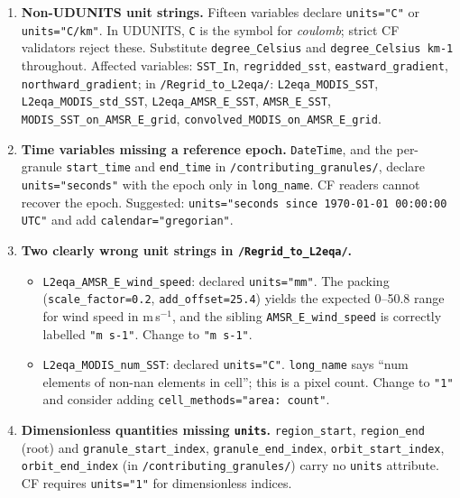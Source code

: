 \documentclass[11pt]{article}
\begin{document}
\begin{enumerate}[leftmargin=*,topsep=2pt]
  \item \textbf{Non-UDUNITS unit strings.} Fifteen variables declare
    \texttt{units="C"} or \texttt{units="C/km"}. In UDUNITS,
    \texttt{C} is the symbol for \emph{coulomb}; strict CF
    validators reject these. Substitute
    \texttt{degree\_Celsius} and \texttt{degree\_Celsius km-1}
    throughout. Affected variables: \texttt{SST\_In},
    \texttt{regridded\_sst}, \texttt{eastward\_gradient},
    \texttt{northward\_gradient}; in
    \texttt{/Regrid\_to\_L2eqa/}: \texttt{L2eqa\_MODIS\_SST},
    \texttt{L2eqa\_MODIS\_std\_SST},
    \texttt{L2eqa\_AMSR\_E\_SST}, \texttt{AMSR\_E\_SST},
    \texttt{MODIS\_SST\_on\_AMSR\_E\_grid},
    \texttt{convolved\_MODIS\_on\_AMSR\_E\_grid}.

  \item \textbf{Time variables missing a reference epoch.}
    \texttt{DateTime}, and the per-granule \texttt{start\_time} and
    \texttt{end\_time} in \texttt{/contributing\_granules/}, declare
    \texttt{units="seconds"} with the epoch only in
    \texttt{long\_name}. CF readers cannot recover the epoch.
    Suggested: \texttt{units="seconds since 1970-01-01 00:00:00
    UTC"} and add \texttt{calendar="gregorian"}.

  \item \textbf{Two clearly wrong unit strings in
    \texttt{/Regrid\_to\_L2eqa/}.}
    \begin{itemize}[topsep=0pt]
      \item \texttt{L2eqa\_AMSR\_E\_wind\_speed}: declared
        \texttt{units="mm"}. The packing
        (\texttt{scale\_factor=0.2}, \texttt{add\_offset=25.4})
        yields the expected 0--50.8 range for wind speed in
        m\,s$^{-1}$, and the sibling \texttt{AMSR\_E\_wind\_speed}
        is correctly labelled \texttt{"m s-1"}. Change to
        \texttt{"m s-1"}.
      \item \texttt{L2eqa\_MODIS\_num\_SST}: declared
        \texttt{units="C"}. \texttt{long\_name} says
        ``num elements of non-nan elements in cell''; this is a
        pixel count. Change to \texttt{"1"} and consider adding
        \texttt{cell\_methods="area: count"}.
    \end{itemize}

  \item \textbf{Dimensionless quantities missing \texttt{units}.}
    \texttt{region\_start}, \texttt{region\_end} (root) and
    \texttt{granule\_start\_index}, \texttt{granule\_end\_index},
    \texttt{orbit\_start\_index}, \texttt{orbit\_end\_index} (in
    \texttt{/contributing\_granules/}) carry no \texttt{units}
    attribute. CF requires \texttt{units="1"} for dimensionless
    indices.


\end{enumerate}
\end{document}
